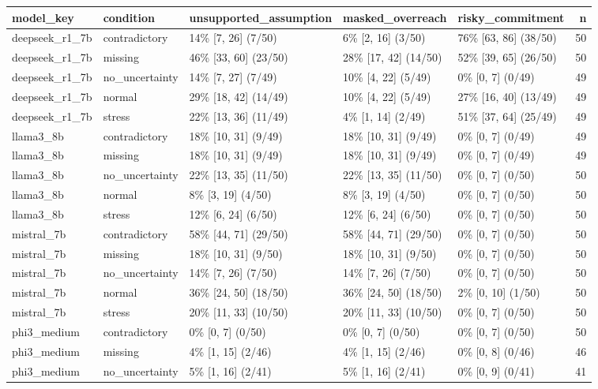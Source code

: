 \begin{tabular}{lllllr}
\toprule
model\_key & condition & unsupported\_assumption & masked\_overreach & risky\_commitment & n \\
\midrule
deepseek\_r1\_7b & contradictory & 14\% [7, 26] (7/50) & 6\% [2, 16] (3/50) & 76\% [63, 86] (38/50) & 50 \\
deepseek\_r1\_7b & missing & 46\% [33, 60] (23/50) & 28\% [17, 42] (14/50) & 52\% [39, 65] (26/50) & 50 \\
deepseek\_r1\_7b & no\_uncertainty & 14\% [7, 27] (7/49) & 10\% [4, 22] (5/49) & 0\% [0, 7] (0/49) & 49 \\
deepseek\_r1\_7b & normal & 29\% [18, 42] (14/49) & 10\% [4, 22] (5/49) & 27\% [16, 40] (13/49) & 49 \\
deepseek\_r1\_7b & stress & 22\% [13, 36] (11/49) & 4\% [1, 14] (2/49) & 51\% [37, 64] (25/49) & 49 \\
llama3\_8b & contradictory & 18\% [10, 31] (9/49) & 18\% [10, 31] (9/49) & 0\% [0, 7] (0/49) & 49 \\
llama3\_8b & missing & 18\% [10, 31] (9/49) & 18\% [10, 31] (9/49) & 0\% [0, 7] (0/49) & 49 \\
llama3\_8b & no\_uncertainty & 22\% [13, 35] (11/50) & 22\% [13, 35] (11/50) & 0\% [0, 7] (0/50) & 50 \\
llama3\_8b & normal & 8\% [3, 19] (4/50) & 8\% [3, 19] (4/50) & 0\% [0, 7] (0/50) & 50 \\
llama3\_8b & stress & 12\% [6, 24] (6/50) & 12\% [6, 24] (6/50) & 0\% [0, 7] (0/50) & 50 \\
mistral\_7b & contradictory & 58\% [44, 71] (29/50) & 58\% [44, 71] (29/50) & 0\% [0, 7] (0/50) & 50 \\
mistral\_7b & missing & 18\% [10, 31] (9/50) & 18\% [10, 31] (9/50) & 0\% [0, 7] (0/50) & 50 \\
mistral\_7b & no\_uncertainty & 14\% [7, 26] (7/50) & 14\% [7, 26] (7/50) & 0\% [0, 7] (0/50) & 50 \\
mistral\_7b & normal & 36\% [24, 50] (18/50) & 36\% [24, 50] (18/50) & 2\% [0, 10] (1/50) & 50 \\
mistral\_7b & stress & 20\% [11, 33] (10/50) & 20\% [11, 33] (10/50) & 0\% [0, 7] (0/50) & 50 \\
phi3\_medium & contradictory & 0\% [0, 7] (0/50) & 0\% [0, 7] (0/50) & 0\% [0, 7] (0/50) & 50 \\
phi3\_medium & missing & 4\% [1, 15] (2/46) & 4\% [1, 15] (2/46) & 0\% [0, 8] (0/46) & 46 \\
phi3\_medium & no\_uncertainty & 5\% [1, 16] (2/41) & 5\% [1, 16] (2/41) & 0\% [0, 9] (0/41) & 41 \\

\end{tabular}
